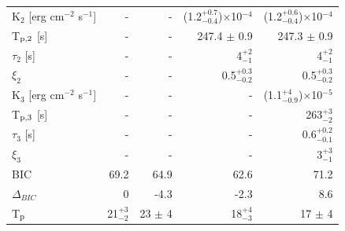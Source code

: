 \documentclass[preprint]{aastex631}
\begin{document}
\begin{table}[h!]
\begin{tabular}{l| r | r | r |  r }
\hline
K$_{2}$ [erg cm$^{-2}$ s$^{-1}$]    &              -                    &                                    -  & (1.2$^{+0.7}_{-0.4}$)$\times$10$^{-4}$    & (1.2$^{+0.6}_{-0.4}$)$\times$10$^{-4}$    \\
T$_{\rm p,2}$  [s]                  &              -                    &                                    -  & 247.4 $\pm$ 0.9                           & 247.3 $\pm$ 0.9                           \\
$\tau_2$       [s]                  &              -                    &                                    -  &  4$^{+2}_{-1}$                            & 4$^{+2}_{-1}$                             \\
$\xi_2$                             &              -                    &                                    -  & 0.5$^{+0.3}_{-0.2}$                       & 0.5$^{+0.3}_{-0.2}$                       \\
\hline  
K$_{3}$ [erg cm$^{-2}$ s$^{-1}$]    &              -                    &                                    -  &                                       -   & (1.1$^{+4}_{-0.9}$)$\times$10$^{-5}$      \\
T$_{\rm p,3}$  [s]                  &              -                    &                                   -   &                                       -   & 263$^{+3}_{-2}$                           \\
$\tau_3$       [s]                  &              -                    &                                   -   &                                       -   & 0.6$^{+0.2}_{-0.1}$                       \\
$\xi_3$                             &              -                    &                                    -  &                                       -   & 3$^{+3}_{-1}$                             \\
\hline  
BIC                                 & 69.2                              & 64.9                                  & 62.6                                      & 71.2                                      \\
$\Delta_{BIC}$                      & 0                                 & -4.3                                  & -2.3                                      & 8.6                                       \\
\hline  
\hline  
T$_{\rm p}$                         & 21$^{+3}_{-2}$                    & 23 $\pm$ 4                            & 18$^{+4}_{-3}$                            & 17 $\pm$ 4                                \\

\end{tabular}
\end{table}
\end{document}
